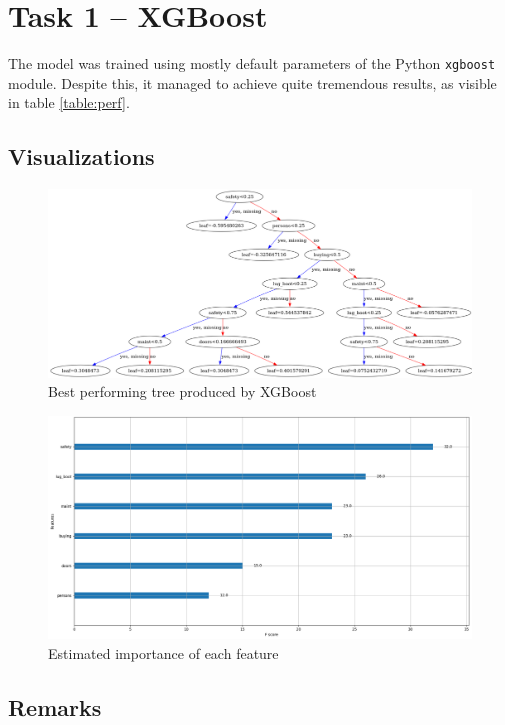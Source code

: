 \documentclass[../main.tex]{subfiles}
\begin{document}
\section{Task 1 -- XGBoost}
The model was trained using mostly default parameters of the Python
\verb`xgboost` module. Despite this, it managed to achieve quite tremendous
results, as visible in table \ref{table:perf}.

\subsection{Visualizations}
\begin{figure}[H]
    \centering
    \includegraphics[width=\linewidth]{../img/xgb-tree.png}
    \caption{Best performing tree produced by XGBoost}
    \label{fig:xgb-tree}
\end{figure}
\begin{figure}[H]
    \centering
    \includegraphics[width=\linewidth]{../img/xgb-feature-importance.png}
    \caption{Estimated importance of each feature}
    \label{fig:xgb-feats}
\end{figure}

\subsection{Remarks}
\end{document}
